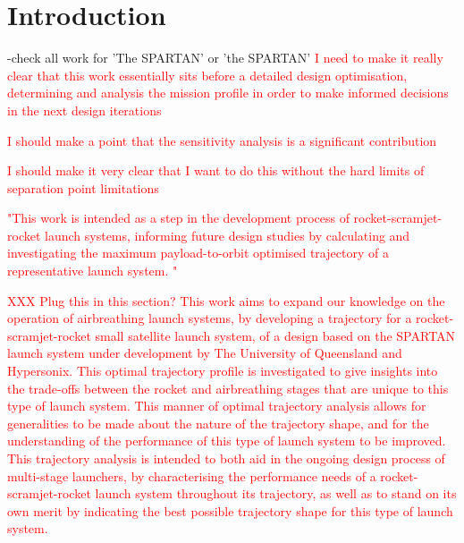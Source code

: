 
\cleardoublepage
\chapter{Introduction}
-check all work for 'The SPARTAN' or 'the SPARTAN'
\textcolor{red}{I need to make it really clear that this work essentially sits before a detailed design optimisation, determining and analysis the mission profile in order to make informed decisions in the next design iterations}
  	
  	\textcolor{red}{I should make a point that the sensitivity analysis is a significant contribution}
  	
  	\textcolor{red}{I should make it very clear that I want to do this without the hard limits of separation point limitations}
  	
  	\textcolor{red}{"This work is intended as a step in the development process of rocket-scramjet-rocket launch systems, informing future design studies by calculating and investigating the maximum payload-to-orbit optimised trajectory of a representative launch system. "}
  	
  	
  	\textcolor{red}{ XXX Plug this in this section? This work aims to expand our knowledge on the operation of airbreathing launch systems, by developing a trajectory for a rocket-scramjet-rocket small satellite launch system, of a design based on the SPARTAN launch system under development by The University of Queensland and Hypersonix. This optimal trajectory profile is investigated to give insights into the trade-offs between the rocket and airbreathing stages that are unique to this type of launch system. This manner of optimal trajectory analysis allows for generalities to be made about the nature of the trajectory shape, and for the understanding of the performance of this type of launch system to be improved.
  	This trajectory analysis is intended to both aid in the ongoing design process of multi-stage launchers, by characterising the performance needs of a rocket-scramjet-rocket launch system throughout its trajectory, as well as to stand on its own merit by indicating the best possible trajectory shape for this type of launch system. }
  	
